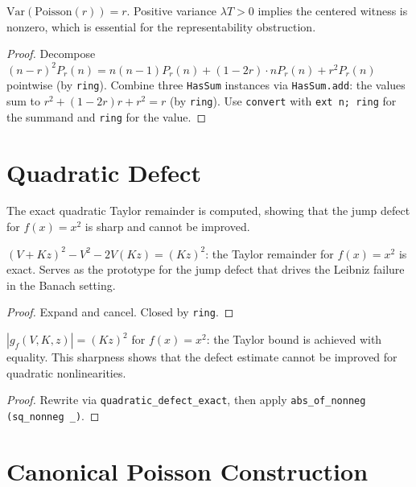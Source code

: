 \begin{theorem}\label{thm:poisson_variance}
\leanok
{}
$\mathrm{Var}(\mathrm{Poisson}(r)) = r$.
Positive variance $\lambda T > 0$ implies the centered witness is nonzero, which is essential for the representability obstruction.
\end{theorem}
\begin{proof}\leanok
Decompose $(n-r)^2 P_r(n) = n(n-1)P_r(n) + (1-2r)\cdot nP_r(n) + r^2 P_r(n)$
pointwise (by \texttt{ring}). Combine three \texttt{HasSum} instances via
\texttt{HasSum.add}: the values sum to $r^2 + (1-2r)r + r^2 = r$ (by \texttt{ring}).
Use \texttt{convert} with \texttt{ext n; ring} for the summand and \texttt{ring} for the value.
\end{proof}

\section{Quadratic Defect}

The exact quadratic Taylor remainder is computed, showing that the jump defect for $f(x) = x^2$ is sharp and cannot be improved.

\begin{theorem}\label{thm:quad_exact}
\leanok
$(V + Kz)^2 - V^2 - 2V(Kz) = (Kz)^2$: the Taylor remainder for $f(x) = x^2$
is exact. Serves as the prototype for the jump defect that drives the Leibniz failure in the Banach setting.
\end{theorem}
\begin{proof}\leanok Expand and cancel. Closed by \texttt{ring}.\end{proof}

\begin{theorem}\label{thm:quad_sharp}
\leanok
{}
$|g_f(V,K,z)| = (Kz)^2$ for $f(x) = x^2$: the Taylor bound is achieved with equality.
This sharpness shows that the defect estimate cannot be improved for quadratic nonlinearities.
\end{theorem}
\begin{proof}\leanok Rewrite via \texttt{quadratic\_defect\_exact}, then apply \texttt{abs\_of\_nonneg (sq\_nonneg \_)}.\end{proof}

\section{Canonical Poisson Construction}

